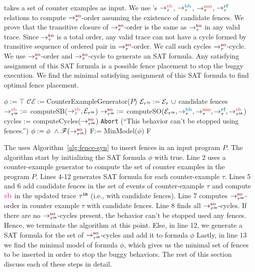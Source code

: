 \ourtechnique takes a set of counter examples as input.
We use \cc 's $\setSB$, $\setHB$, $\setMO$, $\setRF$ relations to compute 
$ \setSO $-order assuming the existence of candidate fences.
We prove that the transitive closure of $ \setSO $-order is the same as 
$ \setTO $ in any valid \cc trace. 
Since $ \setTO $ is a total order, any valid \cc trace can not have a 
cycle formed by transitive sequence of ordered pair in $ \setSO $-order. 
We call such cycles $\setSO$-cycle. 
We use $ \setSO $-order and $ \setSO $-cycle to generate an SAT formula. 
Any satisfying assignment of this SAT formula is a possible fence 
placement to stop the buggy execution. We find the minimal satisfying assignment of this SAT formula to find optimal fence placement. 

\begin{algorithm}
	\caption{\ourtechnique}
	\begin{algorithmic}[1]	
		\State $\phi := \top$
		\State $ \mathcal{CE} := $CounterExampleGenerator($P$)
		\Comment{$\tau$ = $ \langle \events_\tau, \setHB, \setMO, \setRF, \setSB  \rangle $}
			\State $ \events_{\im{\tau}} := \events_\tau\ \union $ candidate fences
			\State $ \seqb{\im{\tau}}{}{} := $ computeSB($\setSB, \events_{\im{\tau}}$) \State $ \so{\tau^{\mathtt{im}}}{}{} := $ computeSO($\events_{\im{\tau}}, \setHB, \setMO, \setRF, \seqb{\im{\tau}}{}{}$)
			\State cycles := computeCycles($ \so{\im{\tau}}{}{} $)
				\State \texttt{Abort} (``This behavior can't be stopped using \cc fences.'')
				\State \Return
			\EndIf
			\State $\phi := \phi\ \^ \formula{\so{\im{\tau}}{}{}} $ 
		\EndFor
		\State F:= MinModel($ \phi $)
		\State \Return F
%		
		\EndProcedure
		\label{alg:fence-syn}
	\end{algorithmic}
\end{algorithm}

The \ourtool uses Algorithm~\ref{alg:fence-syn} to insert fences in an 
input program $ P $. The algorithm start by initializing the 
SAT formula $ \phi $ with true.  Line 2 uses a counter-example generator 
to compute the set of counter examples in the program $ P $. 
Lines 4-12 generates SAT formula for each counter-example $ \tau $.
Lines 5 and 6 add candidate fences in the set of events of counter-example 
$ \tau $ and compute $ \lsb $ in the updated trace $ {\tau}^{\mathtt{im}} $ (i.e., with candidate 
fences). 
Line 7 computes $ \so{\im{\tau}}{}{} $-order in counter example $ \tau $ with candidate fences.
Line 8 finds all $ \so{\im{\tau}}{}{} $-cycles. If there are no $ \so{\im{\tau}}{}{} $-cycles 
present, the behavior can't be stopped used any \cc fences. Hence, we 
terminate the algorithm at this point.
Else, in line 12, we generate a SAT formula for the set of $ \so{\im{\tau}}{}{} $-cycles and add it to formula $ \phi $
Lastly, in line 13 we find the minimal model of formula $ \phi $, which 
gives us the minimal set of fences to be inserted in order to stop the 
buggy behaviors.
The rest of this section discuss each of these steps in detail.

